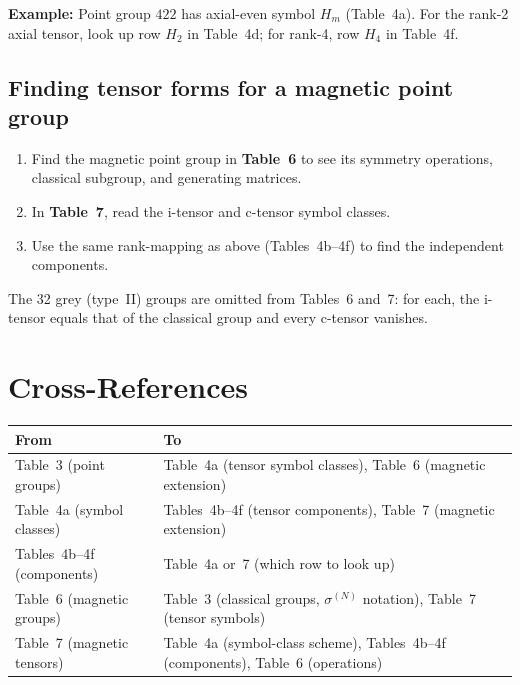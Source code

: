 \documentclass[a4paper,11pt]{article}
\newcommand{\sg}[1]{\sigma^{(#1)}}
\begin{document}
\noindent\textbf{Example:} Point group $422$ has axial-even symbol $H_m$ (Table~4a).
For the rank-2 axial tensor, look up row $H_2$ in Table~4d; for rank-4, row $H_4$
in Table~4f.

\subsection*{Finding tensor forms for a magnetic point group}
\begin{enumerate}\setlength{\itemsep}{1pt}
\item Find the magnetic point group in \textbf{Table~6} to see its symmetry operations,
  classical subgroup, and generating matrices.
\item In \textbf{Table~7}, read the i-tensor and c-tensor symbol classes.
\item Use the same rank-mapping as above (Tables~4b--4f) to find the independent
  components.
\end{enumerate}

\noindent The 32 grey (type~II) groups are omitted from Tables~6 and~7: for each,
the i-tensor equals that of the classical group and every c-tensor vanishes.

\section{Cross-References}

\begin{center}
\renewcommand{\arraystretch}{1.3}
\begin{tabular}{@{}l p{10cm}@{}}
\toprule
\textbf{From} & \textbf{To} \\
\midrule
Table~3 (point groups) & Table~4a (tensor symbol classes), Table~6 (magnetic extension) \\
Table~4a (symbol classes) & Tables~4b--4f (tensor components), Table~7 (magnetic extension) \\
Tables~4b--4f (components) & Table~4a or~7 (which row to look up) \\
Table~6 (magnetic groups) & Table~3 (classical groups, $\sg{N}$ notation), Table~7 (tensor symbols) \\
Table~7 (magnetic tensors) & Table~4a (symbol-class scheme), Tables~4b--4f (components), Table~6 (operations) \\
\bottomrule
\end{tabular}
\end{center}
\end{document}
